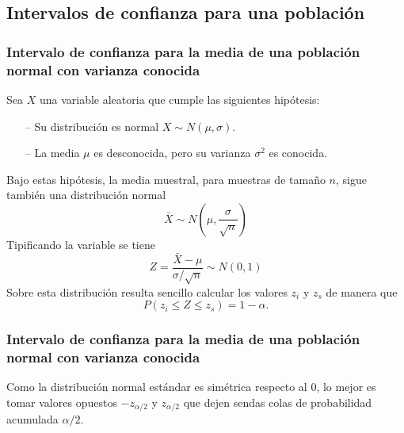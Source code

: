 \subsection{Intervalos de confianza para una población}
\begin{frame}
\frametitle{Intervalo de confianza para la media de una población normal con varianza conocida}
Sea $X$ una variable aleatoria que cumple las siguientes hipótesis:
\begin{itemize}
\item[--] Su distribución es normal $X\sim N(\mu,\sigma)$.
\item[--] La media $\mu$ es desconocida, pero su varianza $\sigma^2$ es conocida.
\end{itemize}

Bajo estas hipótesis, la media muestral, para muestras de tamaño $n$, sigue también una distribución normal
\[
\bar X \sim N\left(\mu,\frac{\sigma}{\sqrt n}\right)
\]
Tipificando la variable se tiene
\[
Z=\frac{\bar X-\mu}{\sigma/\sqrt n} \sim N(0,1)
\]
Sobre esta distribución resulta sencillo calcular los valores $z_i$ y $z_s$ de manera que
\[
P(z_i\leq Z \leq z_s) = 1-\alpha.
\]
\end{frame}


\begin{frame}
\frametitle{Intervalo de confianza para la media de una población normal con varianza conocida}
Como la distribución normal estándar es simétrica respecto al 0, lo mejor es tomar valores opuestos $-z_{\alpha/2}$ y $z_{\alpha/2}$ que dejen sendas colas de probabilidad acumulada $\alpha/2$.
\begin{center}
\scalebox{0.6}{}
\end{center}
\end{frame}



